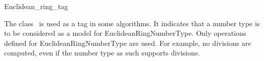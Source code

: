 \begin{ccRefClass} {Euclidean_ring_tag}

\ccDefinition

The class \ccRefName\ is used as a tag in some algorithms. It
indicates that a number type is to be considered as a model for
EuclideanRingNumberType. Only operations defined for
EuclideanRingNumberType are used. For example, no divisions are
computed, even if the number type as such supports divisions.


\ccSeeAlso
{} \\
 \\
 \\

\end{ccRefClass} 
